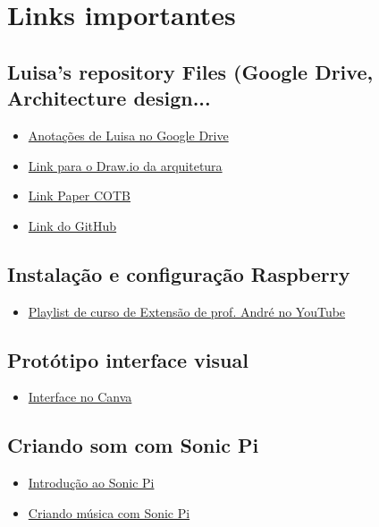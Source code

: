 \documentclass[11pt,a4paper]{article}
\begin{document}
\section{Links importantes}

    \subsection{Luisa's repository Files (Google Drive, Architecture design...}
        \begin{itemize}
            \item \href{https://drive.google.com/drive/folders/1o6-JCINkQ0FW6wflNxQX2QXGrQJeRE1v?usp=sharing}{Anotações de Luisa no Google Drive}
            \item \href{https://drive.google.com/file/d/1Byj-EFS_2pPbINGEN-ElwYOrXvs_eHLL/view?usp=sharing}{Link para o Draw.io da arquitetura}
            \item \href{https://www.overleaf.com/project/68e6425dded8ca081e13f7ea}{Link Paper COTB}
            \item \href{https://github.com/luisablankenburg08/jogo_pygame.git}{Link do GitHub}
        \end{itemize}
    
    \subsection{Instalação e configuração Raspberry}
        \begin{itemize}
            \item \href{https://youtube.com/playlist?list=PL7eqM3uJZ1pK7dlVWirm43lMNS0kQtk-P&si=DWgMLabO2IlJbfhL}{Playlist de curso de Extensão de prof. André no YouTube}
        \end{itemize}
    \subsection{Protótipo interface visual}
        \begin{itemize}
            \item \href{https://www.canva.com/design/DAGwpH8wyio/i7u20WVU_0vb8Oj-3aBwtA/edit?utm_content=DAGwpH8wyio&utm_campaign=designshare&utm_medium=link2&utm_source=sharebutton}{Interface no Canva}
        \end{itemize}
    \subsection{Criando som com Sonic Pi}
    \begin{itemize}
        \item \href{https://projects.raspberrypi.org/en/projects/getting-started-with-sonic-pi/0}{Introdução ao Sonic Pi}
        \item \href{https://www.makerhero.com/blog/sonic-pi-musica-com-raspberry-pi/}{Criando música com Sonic Pi}
    \end{itemize}
\end{document}
